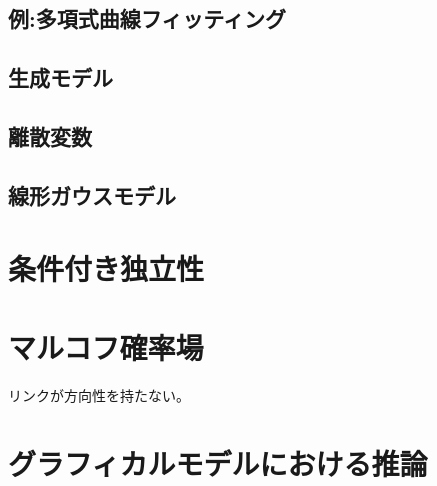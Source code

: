 \documentclass[11pt,a4paper]{jsarticle}
\begin{document}
\subsection{例:多項式曲線フィッティング}
\subsection{生成モデル}
\subsection{離散変数}
\subsection{線形ガウスモデル}
\section{条件付き独立性}
\section{マルコフ確率場}
リンクが方向性を持たない。
\section{グラフィカルモデルにおける推論}
\end{document}
